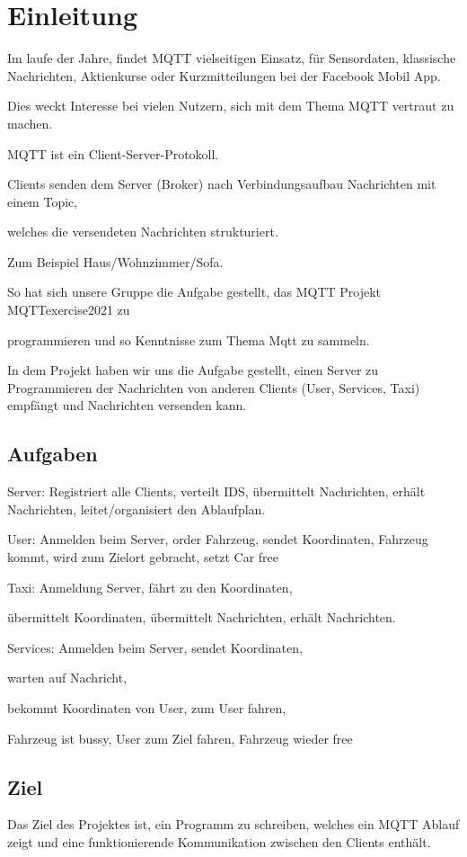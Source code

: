 \section{Einleitung}


Im laufe der Jahre, findet MQTT vielseitigen Einsatz, für Sensordaten, 
klassische Nachrichten, Aktienkurse oder Kurzmitteilungen bei der Facebook Mobil App.


Dies weckt Interesse bei vielen Nutzern, 
sich mit dem Thema MQTT vertraut zu machen.


MQTT ist ein Client-Server-Protokoll.
 

Clients senden dem Server (Broker) 
nach Verbindungsaufbau Nachrichten mit einem Topic, 

welches die versendeten Nachrichten strukturiert. 

Zum Beispiel Haus/Wohnzimmer/Sofa.


So hat sich unsere Gruppe die Aufgabe gestellt, 
das MQTT Projekt MQTTexercise2021 zu 

programmieren und so Kenntnisse zum Thema Mqtt zu sammeln.


In dem Projekt haben wir uns die Aufgabe gestellt, 
einen Server zu Programmieren der Nachrichten von anderen Clients (User, Services, Taxi) empfängt und Nachrichten versenden kann.


\subsection{Aufgaben}

Server: Registriert alle Clients, verteilt IDS, übermittelt Nachrichten, 
erhält Nachrichten, leitet/organisiert den Ablaufplan.


User: Anmelden beim Server, order Fahrzeug, sendet Koordinaten, Fahrzeug kommt, wird zum Zielort gebracht, setzt Car free


Taxi: Anmeldung Server, fährt zu den Koordinaten, 

übermittelt Koordinaten, übermittelt Nachrichten, erhält Nachrichten.


Services: Anmelden beim Server, sendet Koordinaten, 

warten auf Nachricht, 

bekommt Koordinaten von User, zum User fahren, 

Fahrzeug ist  bussy, User zum Ziel fahren, Fahrzeug wieder free

\subsection{Ziel}

Das Ziel des Projektes ist, ein Programm zu schreiben, welches ein MQTT Ablauf zeigt und eine funktionierende Kommunikation zwischen den Clients enthält.

